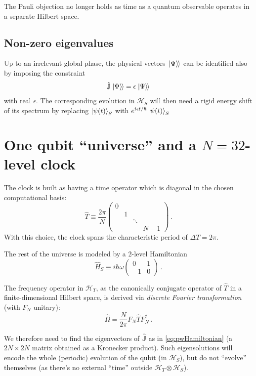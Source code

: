 \documentclass[a0,portrait]{a0poster}
\newcommand{\hilb}[1]{\mathcal{#1}}       %
\newcommand{\ox}{\otimes}
\DeclareMathOperator*{\repr}{\equiv}      %
\newcommand{\smallback}{\hspace{-0.115em}}
\newcommand{\dket}[1]{\left.\left| #1 \right\rangle\smallback\right\rangle}
\begin{document}
\begin{multicols}{2}
The Pauli objection no longer holds as time as a quantum observable operates in a separate Hilbert space.

\subsection*{Non-zero eigenvalues}

Up to an irrelevant global
phase, the physical vectors $\dket{\Psi}$ can be identified also by
imposing the constraint
\[
  \hat{\mathbb{J}}\dket{\Psi} = \epsilon \dket{\Psi}
\]
with real $\epsilon$. The corresponding evolution in $\hilb{H}_S$ will then need
a rigid energy shift of its spectrum by replacing $\ket{\psi(t)}_S$
with $e^{i \epsilon t / \hbar} \ket{\psi(t)}_S$

\section*{One qubit ``universe'' and a $N=32$-level clock}

The clock is built as having a time operator which is diagonal in the
chosen computational basis:
\[
  \hat{T} \repr \frac{2\pi}{N}
  \begin{pmatrix}
    0           &       &       &       \\
                &1      &       &       \\
                &       &\ddots &       \\
                &       &       &N-1
  \end{pmatrix} \,\text{.}
\]
With this choice, the clock spans the characteristic period of $\Delta T = 2\pi$.

The rest of the universe is modeled by a 2-level Hamiltonian
\[
  \hat{H}_S \repr
  i \hbar \omega
  \begin{pmatrix}
    0   & 1   \\
    -1  & 0
  \end{pmatrix}
  \, \text{.}
\]

The frequency operator in $\hilb{H}_T$, as the canonically conjugate operator
of $\hat{T}$ in a finite-dimensional Hilbert space, is derived via
\emph{discrete Fourier transformation} (with $F_N$ unitary):
\[
  \hat{\Omega} = \frac{N}{2\pi} F^{}_{N} \hat{T} F^{\dagger}_{N} \, \text{.}
\]

We therefore need to find the eigenvectors of $\hat{\mathbb{J}}$ as in \eqref{eq:pwHamiltonian}
(a $2N \times 2N$ matrix obtained as a Kronecker product). Such eigensolutions
will encode the whole (periodic) evolution of the qubit (in $\hilb{H}_S$), but do
not ``evolve'' themselves (as there's no external ``time'' outside $\hilb{H}_T \ox \hilb{H}_S$).


\end{multicols}
\end{document}
